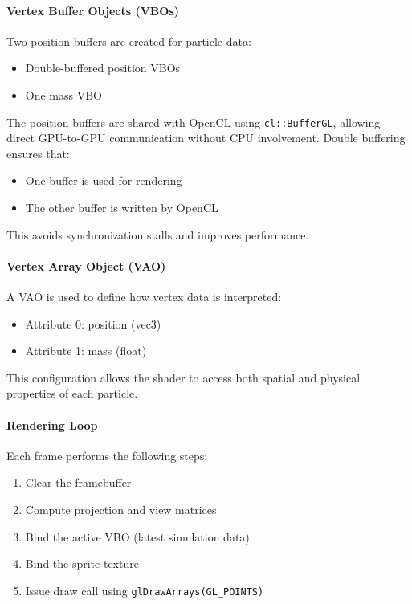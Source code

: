 \documentclass[12pt]{article}
\begin{document}
\paragraph{Vertex Buffer Objects (VBOs)}

Two position buffers are created for particle data:
\begin{itemize}
\item Double-buffered position VBOs
\item One mass VBO
\end{itemize}

The position buffers are shared with OpenCL using \texttt{cl::BufferGL}, allowing direct GPU-to-GPU communication without CPU involvement.
Double buffering ensures that:
\begin{itemize}
\item One buffer is used for rendering
\item The other buffer is written by OpenCL
\end{itemize}

This avoids synchronization stalls and improves performance.

\paragraph{Vertex Array Object (VAO)}

A VAO is used to define how vertex data is interpreted:

\begin{itemize}
\item Attribute 0: position (vec3)
\item Attribute 1: mass (float)
\end{itemize}

This configuration allows the shader to access both spatial and physical properties of each particle.

\paragraph{Rendering Loop}

Each frame performs the following steps:

\begin{enumerate}
    \item Clear the framebuffer
    \item Compute projection and view matrices
    \item Bind the active VBO (latest simulation data)
    \item Bind the sprite texture
    \item Issue draw call using \texttt{glDrawArrays(GL\_POINTS)}
\end{enumerate}
\end{document}
